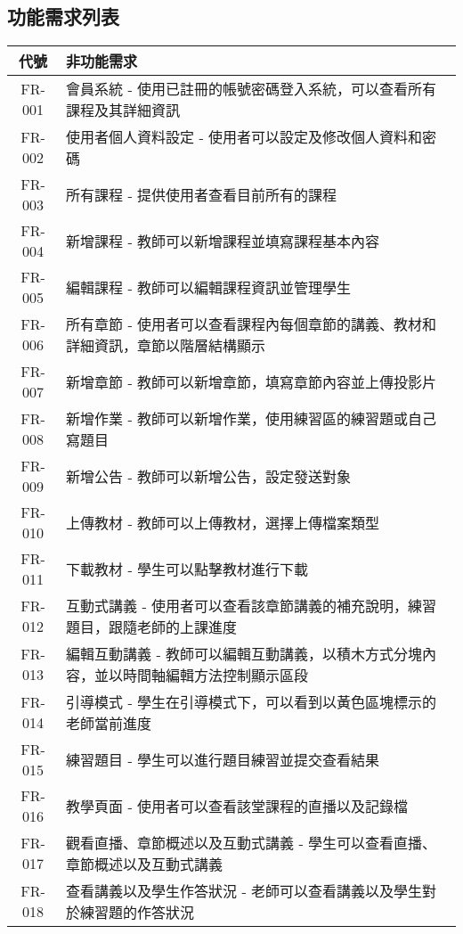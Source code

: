 \documentclass[12pt]{article}
\begin{document}
\subsection{功能需求列表}
\begin{table}[H]
  \centering
  \begin{tabular}{|c|p{14.5cm}|}
    \hline
    \textbf{代號} & \textbf{非功能需求} \\
    \hline
    FR-001 & 會員系統 - 使用已註冊的帳號密碼登入系統，可以查看所有課程及其詳細資訊 \\  \hline
    FR-002 & 使用者個人資料設定 - 使用者可以設定及修改個人資料和密碼 \\  \hline
    FR-003 & 所有課程 - 提供使用者查看目前所有的課程 \\  \hline
    FR-004 & 新增課程 - 教師可以新增課程並填寫課程基本內容 \\  \hline
    FR-005 & 編輯課程 - 教師可以編輯課程資訊並管理學生 \\  \hline
    FR-006 & 所有章節 - 使用者可以查看課程內每個章節的講義、教材和詳細資訊，章節以階層結構顯示 \\  \hline
    FR-007 & 新增章節 - 教師可以新增章節，填寫章節內容並上傳投影片 \\  \hline
    FR-008 & 新增作業 - 教師可以新增作業，使用練習區的練習題或自己寫題目 \\  \hline
    FR-009 & 新增公告 - 教師可以新增公告，設定發送對象 \\  \hline
    FR-010 & 上傳教材 - 教師可以上傳教材，選擇上傳檔案類型 \\  \hline
    FR-011 & 下載教材 - 學生可以點擊教材進行下載 \\  \hline
    FR-012 & 互動式講義 - 使用者可以查看該章節講義的補充說明，練習題目，跟隨老師的上課進度 \\  \hline
    FR-013 & 編輯互動講義 - 教師可以編輯互動講義，以積木方式分塊內容，並以時間軸編輯方法控制顯示區段 \\  \hline
    FR-014 & 引導模式 - 學生在引導模式下，可以看到以黃色區塊標示的老師當前進度 \\  \hline
    FR-015 & 練習題目 - 學生可以進行題目練習並提交查看結果 \\  \hline
    FR-016 & 教學頁面 - 使用者可以查看該堂課程的直播以及記錄檔 \\  \hline
    FR-017 & 觀看直播、章節概述以及互動式講義 - 學生可以查看直播、章節概述以及互動式講義 \\  \hline
    FR-018 & 查看講義以及學生作答狀況 - 老師可以查看講義以及學生對於練習題的作答狀況 \\  \hline

\end{tabular}
\end{table}
\end{document}
